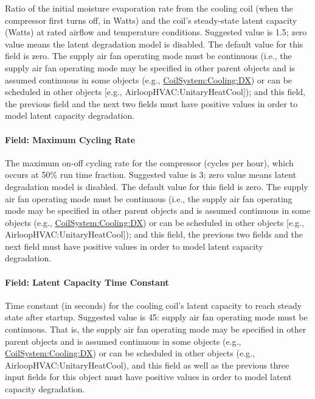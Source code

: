 Ratio of the initial moisture evaporation rate from the cooling coil (when the compressor first turns off, in Watts) and the coil's steady-state latent capacity (Watts) at rated airflow and temperature conditions. Suggested value is 1.5; zero value means the latent degradation model is disabled. The default value for this field is zero. The supply air fan operating mode must be continuous (i.e., the supply air fan operating mode may be specified in other parent objects and is assumed continuous in some objects (e.g., \hyperref[coilsystemcoolingdx]{CoilSystem:Cooling:DX}) or can be scheduled in other objects {[}e.g., AirloopHVAC:UnitaryHeatCool{]}); and this field, the previous field and the next two fields must have positive values in order to model latent capacity degradation.

\paragraph{Field: Maximum Cycling Rate}\label{field-maximum-cycling-rate}

The maximum on-off cycling rate for the compressor (cycles per hour), which occurs at 50\% run time fraction. Suggested value is 3; zero value means latent degradation model is disabled. The default value for this field is zero. The supply air fan operating mode must be continuous (i.e., the supply air fan operating mode may be specified in other parent objects and is assumed continuous in some objects (e.g., \hyperref[coilsystemcoolingdx]{CoilSystem:Cooling:DX}) or can be scheduled in other objects {[}e.g., AirloopHVAC:UnitaryHeatCool{]}); and this field, the previous two fields and the next field must have positive values in order to model latent capacity degradation.

\paragraph{Field: Latent Capacity Time Constant}\label{field-latent-capacity-time-constant}

Time constant (in seconds) for the cooling coil's latent capacity to reach steady state after startup. Suggested value is 45: supply air fan operating mode must be continuous. That is, the supply air fan operating mode may be specified in other parent objects and is assumed continuous in some objects (e.g., \hyperref[coilsystemcoolingdx]{CoilSystem:Cooling:DX}) or can be scheduled in other objects (e.g., AirloopHVAC:UnitaryHeatCool), and this field as well as the previous three input fields for this object must have positive values in order to model latent capacity degradation.

